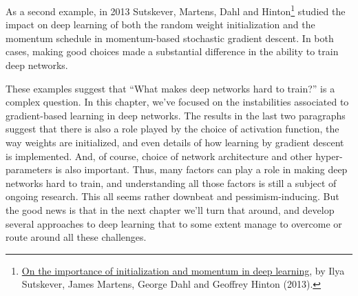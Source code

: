 \documentclass[a4paper,twoside,10pt]{book}
\begin{document}
As a second example, in 2013 Sutskever, Martens, Dahl and Hinton\footnote{\href{http://www.cs.toronto.edu/~hinton/absps/momentum.pdf}{On the importance of initialization and momentum in deep learning}, by Ilya Sutskever, James Martens, George Dahl and Geoffrey Hinton (2013).} studied the impact on deep learning of both the random weight initialization and the momentum schedule in momentum-based stochastic gradient descent. In both cases, making good choices made a substantial difference in the ability to train deep networks.

These examples suggest that ``What makes deep networks hard to train?'' is a complex question. In this chapter, we've focused on the instabilities associated to gradient-based learning in deep networks. The results in the last two paragraphs suggest that there is also a role played by the choice of activation function, the way weights are initialized, and even details of how learning by gradient descent is implemented. And, of course, choice of network architecture and other hyper-parameters is also important. Thus, many factors can play a role in making deep networks hard to train, and understanding all those factors is still a subject of ongoing research. This all seems rather downbeat and pessimism-inducing. But the good news is that in the next chapter we'll turn that around, and develop several approaches to deep learning that to some extent manage to overcome or route around all these challenges.
\end{document}
